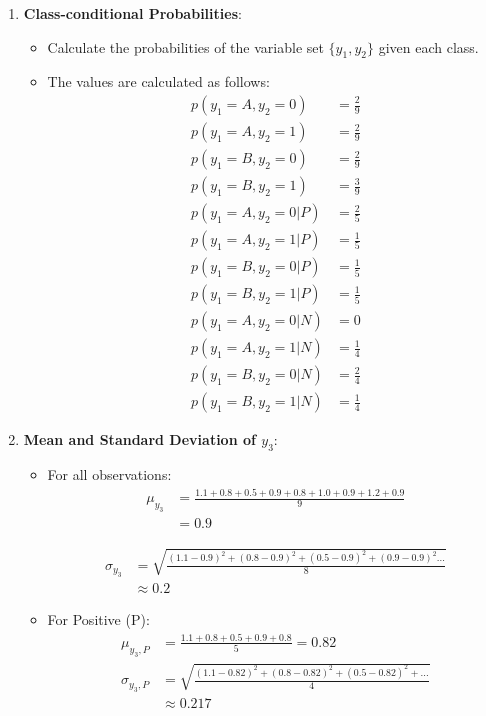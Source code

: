 \documentclass{article}
\begin{document}
\begin{enumerate}[leftmargin=\labelsep]
\begin{enumerate}
  \item \textbf{Class-conditional Probabilities}:
  \begin{itemize}
      \item Calculate the probabilities of the variable set \(\{y_1, y_2\}\) given each class.
      \item The values are calculated as follows:
      \begin{align*}
        p(y_1 = A, y_2 = 0) &= \frac{2}{9} \\
        p(y_1 = A, y_2 = 1) &= \frac{2}{9} \\
        p(y_1 = B, y_2 = 0) &= \frac{2}{9} \\
        p(y_1 = B, y_2 = 1) &= \frac{3}{9} \\
        p(y_1 = A, y_2 = 0 | P) &= \frac{2}{5} \\
        p(y_1 = A, y_2 = 1 | P) &= \frac{1}{5} \\
        p(y_1 = B, y_2 = 0 | P) &= \frac{1}{5} \\
        p(y_1 = B, y_2 = 1 | P) &= \frac{1}{5} \\
        p(y_1 = A, y_2 = 0 | N) &= 0 \\
        p(y_1 = A, y_2 = 1 | N) &= \frac{1}{4} \\
        p(y_1 = B, y_2 = 0 | N) &= \frac{2}{4} \\
        p(y_1 = B, y_2 = 1 | N) &= \frac{1}{4}
      \end{align*}
  \end{itemize}

  \item \textbf{Mean and Standard Deviation of \(y_3\)}:
  \begin{itemize}
      \item For all observations:  
      \begin{align*}
        \mu_{y_3} &= \frac{1.1 + 0.8 + 0.5 + 0.9 + 0.8 + 1.0 + 0.9 + 1.2 + 0.9}{9} \\ 
              &= 0.9
      \end{align*}
      
      \begin{align*}
        \sigma_{y_3} &= \sqrt{\frac{(1.1 - 0.9)^2 + (0.8 - 0.9)^2 + (0.5 - 0.9)^2 + (0.9 - 0.9)^2...}{8}} \\
                  &\approx 0.2
      \end{align*}
      
      \item For Positive (P):
      \begin{align*}
        \mu_{y_3,P} &= \frac{1.1 + 0.8 + 0.5 + 0.9 + 0.8}{5} = 0.82 \\
        \sigma_{y_3,P} &= \sqrt{\frac{(1.1 - 0.82)^2 + (0.8 - 0.82)^2 + (0.5 - 0.82)^2 + ...}{4}} \\
                  &\approx 0.217
      \end{align*}
      

\end{itemize}
\end{enumerate}
\end{enumerate}
\end{document}
